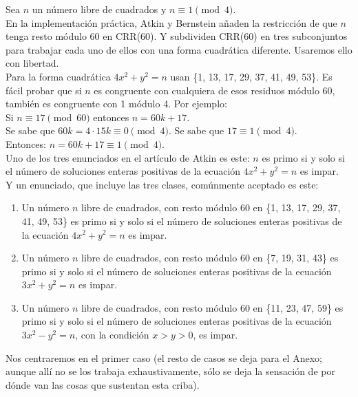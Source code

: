 Sea $n$ un número libre de cuadrados y $n \equiv 1 \pmod 4$. \\
En la implementación práctica, Atkin y Bernstein añaden la restricción de que $n$ tenga resto módulo 60 en CRR(60). Y subdividen CRR(60) en tres subconjuntos para trabajar cada uno de ellos con una forma cuadrática diferente. Usaremos ello con libertad. \\
Para la forma cuadrática $4x^2+y^2 = n$ usan \{1, 13, 17, 29, 37, 41, 49, 53\}. Es fácil probar que si $n$ es congruente con cualquiera de esos residuos módulo 60, también es congruente con 1 módulo 4. Por ejemplo: \\
Si  $n \equiv 17 \pmod {60}$ entonces $n = 60k + 17$.\\
Se sabe que $60k = 4 \cdot 15k \equiv 0 \pmod 4$.
Se sabe que $17 \equiv 1 \pmod 4$. \\
Entonces: $n = 60k+17 \equiv 1 \pmod 4$. \\ 
Uno de los tres enunciados en el artículo de Atkin es este: $n$ es primo si y solo si el número de soluciones enteras positivas de la ecuación $4x^2+y^2 = n$ es impar. \\
Y un enunciado, que incluye las tres clases, comúnmente aceptado es este:
\begin{enumerate}[label=\roman*)]
\item Un número $n$ libre de cuadrados, con resto módulo 60 en \{1, 13, 17, 29, 37, 41, 49, 53\} es primo si y solo si el número de soluciones enteras positivas de la ecuación $4x^2+y^2=n$ es impar.
\item Un número $n$ libre de cuadrados, con resto módulo 60 en \{7, 19, 31, 43\} es primo si y solo si el número de soluciones enteras positivas de la ecuación $3x^2+y^2=n$ es impar.
\item Un número $n$ libre de cuadrados, con resto módulo 60 en \{11, 23, 47, 59\} es primo si y solo si el número de soluciones enteras positivas de la ecuación $3x^2 - y^2=n$, con la condición $x>y>0$, es impar.
\end{enumerate}

Nos centraremos en el primer caso (el resto de casos se deja para el Anexo; aunque allí no se los trabaja exhaustivamente, sólo se deja la sensación de por dónde van las cosas que sustentan esta criba).

